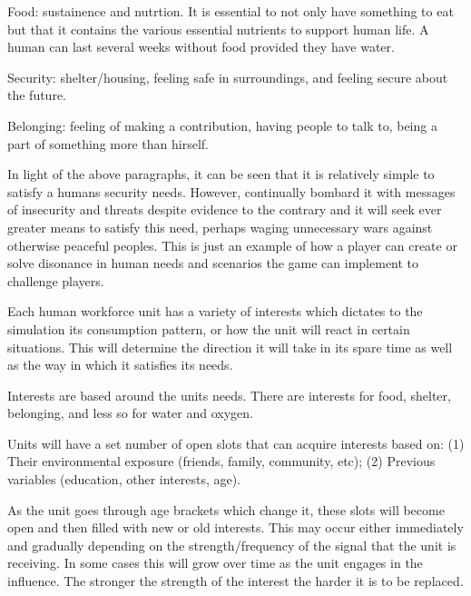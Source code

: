 Food: sustainence and nutrtion. It is essential to not only have something to eat but that it contains the various essential nutrients to support human life. A human can last several weeks without food provided they have water.

Security: shelter/housing, feeling safe in surroundings, and feeling secure about the future.

Belonging: feeling of making a contribution, having people to talk to, being a part of something more than hirself.

In light of the above paragraphs, it can be seen that it is relatively simple to satisfy a humans security needs. However, continually bombard it with messages of insecurity and threats despite evidence to the contrary and it will seek ever greater means to satisfy this need, perhaps waging unnecessary wars against otherwise peaceful peoples. This is just an example of how a player can create or solve disonance in human needs and scenarios the game can implement to challenge players.

Each human workforce unit has a variety of interests which dictates to the simulation its consumption pattern, or how the unit will react in certain situations. This will determine the direction it will take in its spare time as well as the way in which it satisfies its needs. 

Interests are based around the units needs. There are interests for food, shelter, belonging, and less so for water and oxygen.

Units will have a set number of open slots that can acquire interests based on: (1) Their environmental exposure (friends, family, community, etc); (2) Previous variables (education, other interests, age).


As the unit goes through age brackets which change it, these slots will become open and then filled with new or old interests. This may occur either immediately and gradually depending on the strength/frequency of the signal that the unit is receiving. In some cases this will grow over time as the unit engages in the influence. The stronger the strength of the interest the harder it is to be replaced.

